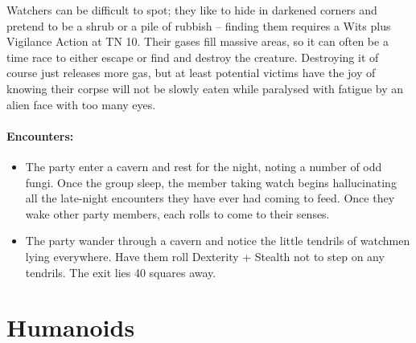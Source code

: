 \begin{multicols}{2}
Watchers can be difficult to spot; they like to hide in darkened corners and pretend to be a shrub or a pile of rubbish -- finding them requires a Wits plus Vigilance Action at TN 10.
Their gases fill massive areas, so it can often be a time race to either escape or find and destroy the creature.
Destroying it of course just releases more gas, but at least potential victims have the joy of knowing their corpse will not be slowly eaten while paralysed with fatigue by an alien face with too many eyes.

\paragraph{Encounters:}

\begin{itemize}

  \item
  The party enter a cavern and rest for the night, noting a number of odd fungi.
  Once the group sleep, the member taking watch begins hallucinating all the late-night encounters they have ever had coming to feed.
  Once they wake other party members, each rolls to come to their senses.
  \item
  The party wander through a cavern and notice the little tendrils of watchmen lying everywhere.
  Have them roll Dexterity + Stealth not to step on any tendrils.
  The exit lies 40 squares away.

\end{itemize}

\watcher

\end{multicols}

\section{Humanoids}


